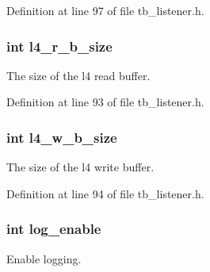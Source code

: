 Definition at line 97 of file tb\-\_\-listener.\-h.

\hypertarget{structtb__test__params__t_a8ae9ae9a85fbb77bc460b0d43e4fc1c5}{
\subsubsection[{l4\-\_\-r\-\_\-b\-\_\-size}]{\setlength{\rightskip}{0pt plus 5cm}int l4\-\_\-r\-\_\-b\-\_\-size}}\label{structtb__test__params__t_a8ae9ae9a85fbb77bc460b0d43e4fc1c5}


The size of the l4 read buffer. 



Definition at line 93 of file tb\-\_\-listener.\-h.

\hypertarget{structtb__test__params__t_a97320ff488c6ed44b28b034c826482c7}{
\subsubsection[{l4\-\_\-w\-\_\-b\-\_\-size}]{\setlength{\rightskip}{0pt plus 5cm}int l4\-\_\-w\-\_\-b\-\_\-size}}\label{structtb__test__params__t_a97320ff488c6ed44b28b034c826482c7}


The size of the l4 write buffer. 



Definition at line 94 of file tb\-\_\-listener.\-h.

\hypertarget{structtb__test__params__t_ac5bfaec8717601161bb642175e1d85e0}{
\subsubsection[{log\-\_\-enable}]{\setlength{\rightskip}{0pt plus 5cm}int log\-\_\-enable}}\label{structtb__test__params__t_ac5bfaec8717601161bb642175e1d85e0}


Enable logging. 




